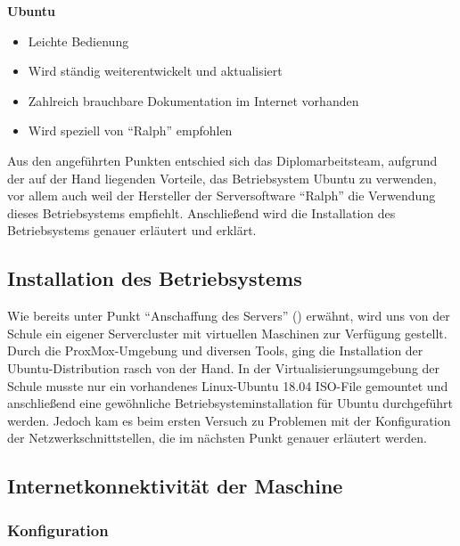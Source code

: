 \documentclass[
]{article}
\providecommand{\tightlist}{%
  \setlength{\itemsep}{0pt}\setlength{\parskip}{0pt}}
\begin{document}
\textbf{Ubuntu}

\begin{itemize}
\tightlist
\item
  Leichte Bedienung
\item
  Wird ständig weiterentwickelt und aktualisiert
\item
  Zahlreich brauchbare Dokumentation im Internet vorhanden
\item
  Wird speziell von ``Ralph'' empfohlen
\end{itemize}

Aus den angeführten Punkten entschied sich das Diplomarbeitsteam,
aufgrund der auf der Hand liegenden Vorteile, das Betriebsystem Ubuntu
zu verwenden, vor allem auch weil der Hersteller der Serversoftware
``Ralph'' die Verwendung dieses Betriebsystems empfiehlt. Anschließend
wird die Installation des Betriebsystems genauer erläutert und erklärt.

\hypertarget{installation-des-betriebsystems}{%
\subsection{Installation des
Betriebsystems}\label{installation-des-betriebsystems}}

Wie bereits unter Punkt ``Anschaffung des Servers''
() erwähnt, wird uns von der Schule ein
eigener Servercluster mit virtuellen Maschinen zur Verfügung gestellt.
Durch die ProxMox-Umgebung und diversen Tools, ging die Installation der
Ubuntu-Distribution rasch von der Hand. In der Virtualisierungsumgebung
der Schule musste nur ein vorhandenes Linux-Ubuntu 18.04 ISO-File
gemountet und anschließend eine gewöhnliche Betriebsysteminstallation
für Ubuntu durchgeführt werden. Jedoch kam es beim ersten Versuch zu
Problemen mit der Konfiguration der Netzwerkschnittstellen, die im
nächsten Punkt genauer erläutert werden.

\hypertarget{internetkonnektivituxe4t-der-maschine}{%
\subsection{Internetkonnektivität der
Maschine}\label{internetkonnektivituxe4t-der-maschine}}

\hypertarget{konfiguration}{%
\subsubsection{Konfiguration}\label{konfiguration}}
\end{document}
